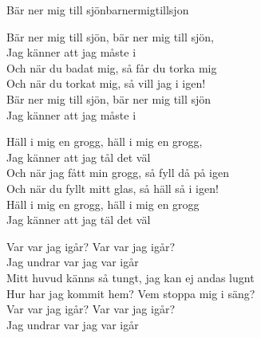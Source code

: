 \begin{song}{Bär ner mig till sjön}{barnermigtillsjon}
\begin{vers}
\repopen Bär ner mig till sjön, bär ner mig till sjön, \\
Jag känner att jag måste i \repclose\\
Och när du badat mig, så får du torka mig\\
Och när du torkat mig, så vill jag i igen!\\
Bär ner mig till sjön, bär ner mig till sjön\\
Jag känner att jag måste i\\
\end{vers}
\begin{vers}
\repopen Häll i mig en grogg, häll i mig en grogg, \\
Jag känner att jag tål det väl \repclose\\
Och när jag fått min grogg, så fyll då på igen\\
Och när du fyllt mitt glas, så häll så i igen!\\
Häll i mig en grogg, häll i mig en grogg\\
Jag känner att jag täl det väl\\
\end{vers}
\begin{vers}
\repopen Var var jag igår? Var var jag igår? \\
Jag undrar var jag var igår \repclose\\
Mitt huvud känns så tungt, jag kan ej andas lugnt\\
Hur har jag kommit hem? Vem stoppa mig i säng?\\
Var var jag igår? Var var jag igår?\\
Jag undrar var jag var igår\\
\end{vers}
\end{song}
